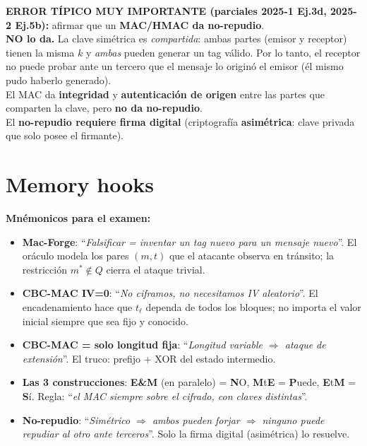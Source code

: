 \documentclass[11pt,a4paper]{article}
\begin{document}
\begin{ojo}
\textbf{ERROR T\'IPICO MUY IMPORTANTE (parciales 2025-1 Ej.3d, 2025-2 Ej.5b):}
afirmar que un \textbf{MAC/HMAC da no-repudio}.\\[4pt]
\textbf{NO lo da.}  La clave sim\'etrica es \emph{compartida}: ambas partes
(emisor y receptor) tienen la misma $k$ y \emph{ambas} pueden generar un tag
v\'alido.  Por lo tanto, el receptor no puede probar ante un tercero que el
mensaje lo origin\'o el emisor (\'el mismo pudo haberlo generado).\\[4pt]
El MAC da \textbf{integridad} y \textbf{autenticaci\'on de origen} entre las partes
que comparten la clave, pero \textbf{no da no-repudio}.\\[4pt]
El \textbf{no-repudio requiere firma digital} (criptograf\'ia
\textbf{asim\'etrica}: clave privada que solo posee el firmante).
\end{ojo}

\section{Memory hooks}

\begin{destacado}
\textbf{Mn\'emonicos para el examen:}
\begin{itemize}[leftmargin=1.4em]
  \item \textbf{Mac-Forge}: ``\emph{Falsificar = inventar un tag nuevo para un
        mensaje nuevo}''.  El or\'aculo modela los pares $(m,t)$ que el atacante
        observa en tr\'ansito; la restricci\'on $m^*\notin Q$ cierra el ataque trivial.
  \item \textbf{CBC-MAC IV=0}: ``\emph{No ciframos, no necesitamos IV aleatorio}''.
        El encadenamiento hace que $t_\ell$ dependa de todos los bloques; no importa
        el valor inicial siempre que sea fijo y conocido.
  \item \textbf{CBC-MAC = solo longitud fija}: ``\emph{Longitud variable
        $\Rightarrow$ ataque de extensi\'on}''.  El truco: prefijo + XOR del estado
        intermedio.
  \item \textbf{Las 3 construcciones}: \textbf{E\&M} (en paralelo) = \textbf{N}O,
        \textbf{M}t\textbf{E} = \textbf{P}uede, \textbf{E}t\textbf{M} = \textbf{S}\'i.
        Regla: ``\emph{el MAC siempre sobre el cifrado, con claves distintas}''.
  \item \textbf{No-repudio}: ``\emph{Sim\'etrico $\Rightarrow$ ambos pueden forjar
        $\Rightarrow$ ninguno puede repudiar al otro ante terceros}''.  Solo la firma
        digital (asim\'etrica) lo resuelve.
\end{itemize}
\end{destacado}
\end{document}
